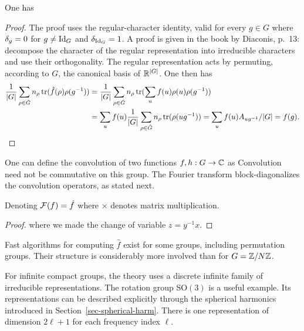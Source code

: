 \begin{prop}
One has
\end{prop}
\begin{proof}
The proof uses the regular-character identity, valid for every $g\in G$
where $\delta_g=0$ for $g \neq \mathrm{Id}_G$ and $\delta_{\mathrm{Id}_G}=1$. A proof is given in the book by Diaconis, p.~13: decompose the character of the regular representation into irreducible characters and use their orthogonality. The regular representation acts by permuting, according to $G$, the canonical basis of $\mathbb{R}^{|G|}$.
%
One then has 
\begin{align*}
	\frac{1}{|G|} \sum_{\rho \in \hat G} n_\rho \operatorname{tr}( \hat f(\rho) \rho(g^{-1}) ) 
	&=  \frac{1}{|G|} \sum_{\rho \in \hat G} n_\rho \operatorname{tr}( \sum_u f(u) \rho(u) \rho(g^{-1}) ) \\
	&=  \sum_u  f(u) \frac{1}{|G|}  \sum_{\rho \in \hat G} n_\rho \operatorname{tr}( \rho(u g^{-1}) )
	=  \sum_u f(u)A_{ug^{-1}}/|G| = f(g).
\end{align*}
\end{proof}

One can define the convolution of two functions $f,h : G \rightarrow \mathbb{C}$ as
Convolution need not be commutative on this group. The Fourier transform block-diagonalizes the convolution operators, as stated next.

\begin{prop}
Denoting $\mathcal{F}(f) = \hat f$
where $\times$ denotes matrix multiplication.
\end{prop}
\begin{proof}
where we made the change of variable $z=y^{-1}x$.
\end{proof}


Fast algorithms for computing $\hat f$ exist for some groups, including permutation groups. Their structure is considerably more involved than for $G=\mathbb{Z}/N\mathbb{Z}$.

For infinite compact groups, the theory uses a discrete infinite family of irreducible representations. The rotation group SO$(3)$ is a useful example. Its representations can be described explicitly through the spherical harmonics introduced in Section~\ref{sec-spherical-harm}. There is one representation of dimension $2\ell+1$ for each frequency index $\ell$.
 
